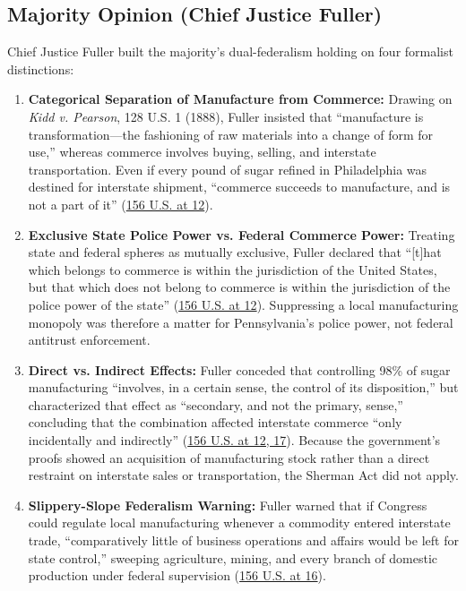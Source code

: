 \documentclass[12pt]{article}
\begin{document}
\subsection{Majority Opinion (Chief Justice Fuller)}

Chief Justice Fuller built the majority's dual-federalism holding on four formalist distinctions:

\begin{enumerate}
  \item \textbf{Categorical Separation of Manufacture from Commerce:} Drawing on \textit{Kidd v. Pearson}, 128 U.S. 1 (1888), Fuller insisted that ``manufacture is transformation---the fashioning of raw materials into a change of form for use,'' whereas commerce involves buying, selling, and interstate transportation. Even if every pound of sugar refined in Philadelphia was destined for interstate shipment, ``commerce succeeds to manufacture, and is not a part of it'' (\href{https://www.law.cornell.edu/supremecourt/text/156/1}{156 U.S. at 12}).
  \item \textbf{Exclusive State Police Power vs. Federal Commerce Power:} Treating state and federal spheres as mutually exclusive, Fuller declared that ``[t]hat which belongs to commerce is within the jurisdiction of the United States, but that which does not belong to commerce is within the jurisdiction of the police power of the state'' (\href{https://www.law.cornell.edu/supremecourt/text/156/1}{156 U.S. at 12}). Suppressing a local manufacturing monopoly was therefore a matter for Pennsylvania's police power, not federal antitrust enforcement.
  \item \textbf{Direct vs. Indirect Effects:} Fuller conceded that controlling 98\% of sugar manufacturing ``involves, in a certain sense, the control of its disposition,'' but characterized that effect as ``secondary, and not the primary, sense,'' concluding that the combination affected interstate commerce ``only incidentally and indirectly'' (\href{https://supreme.justia.com/cases/federal/us/156/1/}{156 U.S. at 12, 17}). Because the government's proofs showed an acquisition of manufacturing stock rather than a direct restraint on interstate sales or transportation, the Sherman Act did not apply.
  \item \textbf{Slippery-Slope Federalism Warning:} Fuller warned that if Congress could regulate local manufacturing whenever a commodity entered interstate trade, ``comparatively little of business operations and affairs would be left for state control,'' sweeping agriculture, mining, and every branch of domestic production under federal supervision (\href{https://www.law.cornell.edu/supremecourt/text/156/1}{156 U.S. at 16}).
\end{enumerate}
\end{document}
